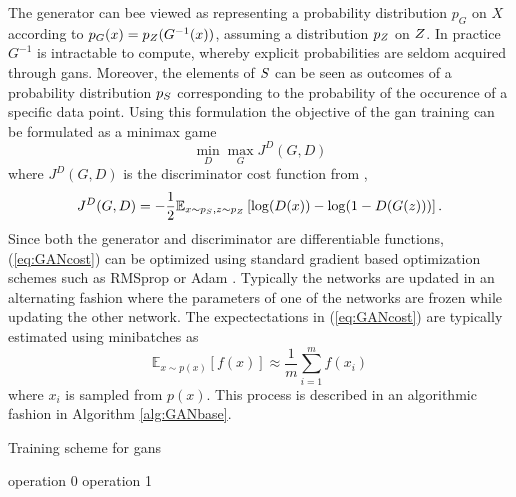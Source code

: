 The generator can bee viewed as representing a probability distribution $p_G$ on $X$ according to $p_G(x) = p_Z(G^{-1}(x))$, assuming a distribution $p_Z$ on $Z$. In practice $G^{-1}$ is intractable to compute, whereby explicit probabilities are seldom acquired through \acrshort{gans}. Moreover, the elements of $S$ can be seen as outcomes of a probability distribution $p_S$ corresponding to the probability of the occurence of a specific data point. Using this formulation the objective of the \acrshort{gan} training can be formulated as a minimax game 
\begin{equation}
    \min_D \max_G J^{D}(G, D)
\end{equation}
where $J^D(G, D)$ is the discriminator cost function from \parencite{goodfellow2016nips},
\begin{equation}
    J^D(G, D) = -\frac{1}{2}\mathbb{E}_{x \sim p_S, z \sim p_Z}\left[\log(D(x)) - \log(1 - D(G(z))) \right].
    \label{eq:GANcost}
\end{equation}
Since both the generator and discriminator are differentiable functions, (\ref{eq:GANcost}) can be optimized using standard gradient based optimization schemes such as RMSprop \parencite{tieleman2012lecture} or Adam \parencite{kingma2014adam}. Typically the networks are updated in an alternating fashion where the parameters of one of the networks are frozen while updating the other network. The expectectations in (\ref{eq:GANcost}) are typically estimated using minibatches as 
\begin{equation}
    \mathbb{E}_{x\sim p(x)}[f(x)] \approx \frac{1}{m}\sum_{i=1}^mf(x_i)
\end{equation}
where $x_i$ is sampled from $p(x)$. This process is described in an algorithmic fashion in Algorithm \ref{alg:GANbase}.

\begin{algorithm}
    \caption{Training scheme for \acrlong{gans}}
  \label{alg:GANbase}
  \begin{algorithmic}[1]
    \STATE operation 0 \label{op0}
    \STATE operation 1 \label{op1}
  \end{algorithmic}
\end{algorithm}


